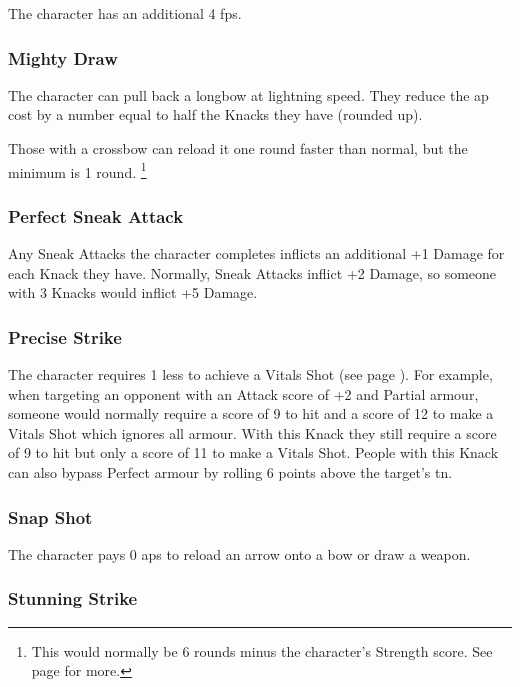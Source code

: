 \begin{multicols}{2}
The character has an additional 4 \glspl{fp}.

\subsubsection{Mighty Draw}

The character can pull back a longbow at lightning speed.
They reduce the \gls{ap} cost by a number equal to half the Knacks they have (rounded up).

Those with a crossbow can reload it one round faster than normal, but the minimum is 1 round.%
\footnote{This would normally be 6 rounds minus the character's Strength score. See page \pageref{crossbow} for more.}

\subsubsection{Perfect Sneak Attack}

Any Sneak Attacks the character completes inflicts an additional +1 Damage for each Knack they have.
Normally, Sneak Attacks inflict +2 Damage, so someone with 3 Knacks would inflict +5 Damage.

\subsubsection{Precise Strike}\label{precisestrike}

The character requires 1 less to achieve a Vitals Shot (see page \pageref{vitals}).
For example, when targeting an opponent with an Attack score of +2 and Partial armour, someone would normally require a score of 9 to hit and a score of 12 to make a Vitals Shot which ignores all armour.
With this Knack they still require a score of 9 to hit but only a score of 11 to make a Vitals Shot.
People with this Knack can also bypass Perfect armour by rolling 6 points above the target's \gls{tn}.

\subsubsection{Snap Shot}

The character pays 0 \glspl{ap} to reload an arrow onto a bow or draw a weapon.

\subsubsection{Stunning Strike}\label{stunningstrike}


\end{multicols}
